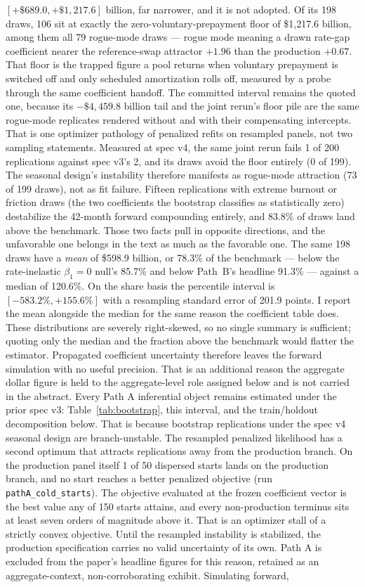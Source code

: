\documentclass[12pt]{article}
\begin{document}
$[+\$689.0, +\$1{,}217.6]$ billion, far narrower, and it is not adopted. Of its 198 draws, 106 sit at exactly the zero-voluntary-prepayment floor of \$1{,}217.6 billion, among them all 79 rogue-mode draws --- rogue mode meaning a drawn rate-gap coefficient nearer the reference-swap attractor $+1.96$ than the production $+0.67$. That floor is the trapped figure a pool returns when voluntary prepayment is switched off and only scheduled amortization rolls off, measured by a probe through the same coefficient handoff. The committed interval remains the quoted one, because its $-\$4{,}459.8$ billion tail and the joint rerun's floor pile are the same rogue-mode replicates rendered without and with their compensating intercepts. That is one optimizer pathology of penalized refits on resampled panels, not two sampling statements. Measured at spec v4, the same joint rerun fails 1 of 200 replications against spec v3's 2, and its draws avoid the floor entirely (0 of 199). The seasonal design's instability therefore manifests as rogue-mode attraction (73 of 199 draws), not as fit failure. Fifteen replications with extreme burnout or friction draws (the two coefficients the bootstrap classifies as statistically zero) destabilize the 42-month forward compounding entirely, and 83.8\% of draws land above the benchmark. Those two facts pull in opposite directions, and the unfavorable one belongs in the text as much as the favorable one. The same 198 draws have a \emph{mean} of \$598.9 billion, or 78.3\% of the benchmark --- below the rate-inelastic $\beta_1 = 0$ null's 85.7\% and below Path~B's headline 91.3\% --- against a median of 120.6\%. On the share basis the percentile interval is $[-583.2\%, +155.6\%]$ with a resampling standard error of 201.9 points. I report the mean alongside the median for the same reason the coefficient table does. These distributions are severely right-skewed, so no single summary is sufficient; quoting only the median and the fraction above the benchmark would flatter the estimator. Propagated coefficient uncertainty therefore leaves the forward simulation with no useful precision. That is an additional reason the aggregate dollar figure is held to the aggregate-level role assigned below and is not carried in the abstract. Every Path A inferential object remains estimated under the prior spec v3: Table~\ref{tab:bootstrap}, this interval, and the train/holdout decomposition below. That is because bootstrap replications under the spec v4 seasonal design are branch-unstable. The resampled penalized likelihood has a second optimum that attracts replications away from the production branch. On the production panel itself 1 of 50 dispersed starts lands on the production branch, and no start reaches a better penalized objective (run \texttt{pathA\_cold\_starts}). The objective evaluated at the frozen coefficient vector is the best value any of 150 starts attains, and every non-production terminus sits at least seven orders of magnitude above it. That is an optimizer stall of a strictly convex objective. Until the resampled instability is stabilized, the production specification carries no valid uncertainty of its own. Path A is excluded from the paper's headline figures for this reason, retained as an aggregate-context, non-corroborating exhibit. Simulating forward, 
\end{document}
